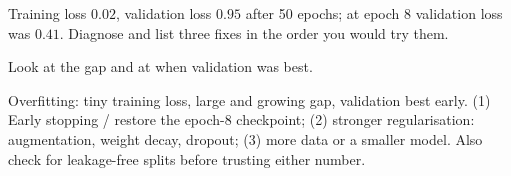 \begin{problem}\twochili
	Training loss $0.02$, validation loss $0.95$ after 50 epochs; at epoch 8 validation loss was $0.41$.
	Diagnose and list three fixes in the order you would try them.
	\begin{hint}Look at the gap and at when validation was best.\end{hint}
	\begin{sol}
		Overfitting: tiny training loss, large and growing gap, validation best early. (1) Early stopping /
		restore the epoch-8 checkpoint; (2) stronger regularisation: augmentation, weight decay, dropout;
		(3) more data or a smaller model. Also check for leakage-free splits before trusting either number.
	\end{sol}
\end{problem}
